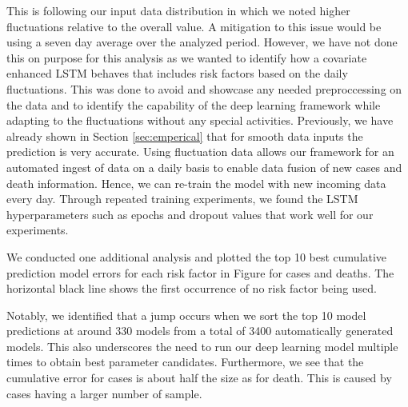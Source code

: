 \documentclass[letterpaper, inpress]{jds} %
\renewcommand{\_}{%
    \textunderscore\hspace{0pt}%
}
\begin{document}
This is following our input data distribution in which we noted higher
fluctuations relative to the overall value. A mitigation to this issue
would be using a seven day average over the analyzed period. However,
we have not done this on purpose for this analysis as we wanted to
identify how a covariate enhanced LSTM behaves that includes risk
factors based on the daily fluctuations. This was done to avoid and
showcase any needed preproccessing on the data and to identify the
capability of the deep learning framework while adapting to the
fluctuations without any special activities. Previously, we have
already shown in Section \ref{sec:emperical} that for smooth data
inputs the prediction is very accurate.  Using fluctuation data allows
our framework for an automated ingest of data on a daily basis to
enable data fusion of new cases and death information. Hence, we can
re-train the model with new incoming data every day. Through repeated
training experiments, we found the LSTM hyperparameters such as epochs
and dropout values that work well for our experiments.

We conducted one additional analysis and plotted the top 10 best
cumulative prediction model errors for each risk factor in
Figure \label{fig:place-top10} for cases and deaths.  The horizontal
black line shows the first occurrence of no risk factor being used.

Notably, we identified that a jump occurs when we sort the top 10
model predictions at around 330 models from a total of 3400
automatically generated models. This also underscores the need to run
our deep learning model multiple times to obtain best parameter
candidates.  Furthermore, we see that the cumulative error for cases
is about half the size as for death. This is caused by cases having a
larger number of sample.

\end{document}
